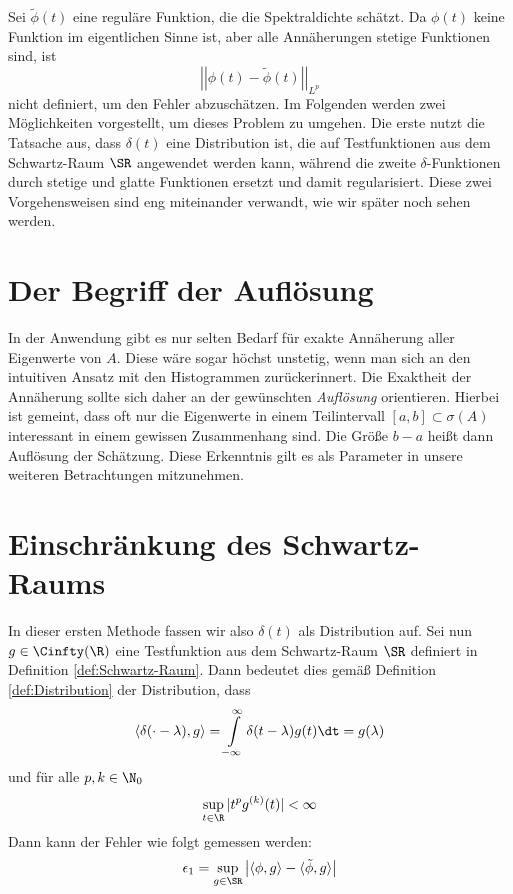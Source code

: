 Sei $\tilde{\phi}(t)$ eine reguläre Funktion, die die Spektraldichte schätzt.
Da $\phi(t)$ keine Funktion im eigentlichen Sinne ist, aber alle Annäherungen stetige Funktionen sind, ist
$$\left|\left|\phi(t) - \tilde{\phi}(t)\right|\right|_{L^p}$$
nicht definiert, um den Fehler abzuschätzen.
Im Folgenden werden zwei Möglichkeiten vorgestellt, um dieses Problem zu umgehen.
Die erste nutzt die Tatsache aus,
dass $\delta(t)$ eine Distribution ist,
die auf Testfunktionen aus dem Schwartz-Raum $\SR$ angewendet werden kann,
während die zweite $\delta$-Funktionen durch stetige und glatte Funktionen ersetzt und damit regularisiert.
Diese zwei Vorgehensweisen sind eng miteinander verwandt, wie wir später noch sehen werden.

\section{Der Begriff der Auflösung}
In der Anwendung gibt es nur selten Bedarf für exakte Annäherung aller Eigenwerte von $A$.
Diese wäre sogar höchst unstetig, wenn man sich an den intuitiven Ansatz mit den Histogrammen zurückerinnert.
Die Exaktheit der Annäherung sollte sich daher an der gewünschten \emph{Auflösung} orientieren.
Hierbei ist gemeint, dass oft nur die Eigenwerte in  einem Teilintervall $[a, b] \subset \sigma(A)$ interessant in einem gewissen Zusammenhang sind.
Die Größe $b - a$ heißt dann Auflösung der Schätzung.
Diese Erkenntnis gilt es als Parameter in unsere weiteren Betrachtungen mitzunehmen.

\section{Einschränkung des Schwartz-Raums}
In dieser ersten Methode fassen wir also $\delta(t)$ als Distribution auf.
Sei nun $g \in \Cinfty(\R)$ eine Testfunktion aus dem Schwartz-Raum $\SR$ definiert in Definition \ref{def:Schwartz-Raum}.
Dann bedeutet dies gemäß Definition \ref{def:Distribution} der Distribution, dass
$$\langle \delta(\cdot - \lambda), g \rangle = \int\limits_{-\infty}^{\infty} \delta(t - \lambda) g(t) \dt = g(\lambda)$$
und für alle $p, k \in \N_0$
$$\sup_{t \in \R} |t^pg^{(k)}(t)| < \infty$$
Dann kann der Fehler wie folgt gemessen werden:
$$\epsilon_1 = \sup_{g \in \SR} \left| \langle \phi, g \rangle - \langle \tilde{\phi}, g \rangle \right|$$

